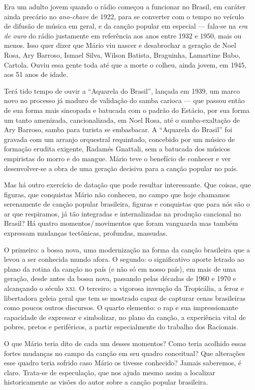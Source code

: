 Era um adulto jovem quando o rádio começou a funcionar no Brasil, em
caráter ainda precário no \textit{ano-chave} de 1922, para se converter com o
tempo no veículo de difusão de música em geral, e da canção popular em
especial --- fala-se na \textit{era de ouro} do rádio justamente em referência
aos anos entre 1932 e 1950, mais ou menos. Isso quer dizer que Mário viu
nascer e desabrochar a geração de Noel Rosa, Ary Barroso, Ismael Silva,
Wilson Batista, Braguinha, Lamartine Babo, Cartola. Ouviu essa gente
toda até que a morte o colheu, ainda jovem, em 1945, aos 51 anos de
idade.

Terá tido tempo de ouvir a ``Aquarela do Brasil'', lançada em 1939, um
marco novo no processo já maduro de validação do samba carioca --- que
passou então de sua forma mais sincopada e batucada com o padrão do
Estácio, por sua forma um tanto amenizada, cancionalizada, em Noel Rosa,
até o samba-exaltação de Ary Barroso, samba para turista se embasbacar.
A ``Aquarela do Brasil'' foi gravada com um arranjo orquestral
requintado, concebido por um músico de formação erudita exigente,
Radamés Gnattali, sem a batucada dos músicos empiristas do morro e do
mangue. Mário teve o benefício de conhecer e ver desenvolver-se a obra
de uma geração decisiva para a canção popular no país.

Mas há outro exercício de datação que pode resultar interessante. Que
coisas, que figuras, que conquistas Mário não conheceu, no campo
que hoje chamamos serenamente de canção popular brasileira, figuras e
conquistas que para nós são o ar que respiramos, já tão integradas e
internalizadas na produção cancional no Brasil? Há quatro
momentos/\,movimentos que foram vanguarda mas também expressam mudanças
tectônicas, profundas, massudas.

O primeiro: a bossa nova, uma modernização na forma da canção brasileira
que a levou a ser conhecida mundo afora. O segundo: o significativo
aporte letrado ao plano da rotina da canção no país (e não só em nosso
país), em mais de uma geração, desde antes da bossa nova, passando pelas
décadas de 1960 e 1970 e alcançando o século \textsc{xxi}. O terceiro: a vigorosa
invenção da Tropicália, a feroz e libertadora geleia geral que tem se
mostrado capaz de capturar cenas brasileiras como poucos outros
discursos. O quarto elemento: o rap e sua impressionante capacidade de
expressar e simbolizar, no plano da canção, a experiência vital de
pobres, pretos e periféricos, a partir especialmente do trabalho dos
Racionais.

O que Mário teria dito de cada um desses momentos? Como teria acolhido
essas fortes mudanças no campo da canção em seu quadro conceitual? Que
alterações esse quadro teria sofrido caso Mário os tivesse conhecido?
Jamais saberemos, é claro. Trata-se de especulação, que nos ajuda mesmo
assim a localizar historicamente as visões do autor sobre a canção
popular brasileira.

